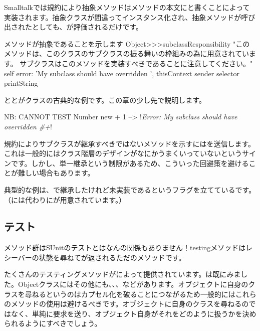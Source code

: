 \documentclass[a4paper,10pt,twoside]{book}
\begin{document}
Smalltalkでは規約により抽象メソッドはメソッドの本文にと書くことによって実装されます。抽象クラスが間違ってインスタンス化され、抽象メソッドが呼び出されたとしても、が評価されるだけです。

\begin{method}{メソッドが抽象であることを示します}
Object>>>subclassResponsibility
    "このメソッドは、このクラスのサブクラスの振る舞いの枠組みの為に用意されています。
    サブクラスはこのメソッドを実装すべきであることに注意してください。"
    self error: 'My subclass should have overridden ', thisContext sender selector printString
\end{method}

ととがクラスの古典的な例です。この章の少し先で説明します。

\begin{code}{NB: CANNOT TEST}
Number new + 1 --> !\emph{Error: My subclass should have overridden \#+}!
\end{code}

規約によりサブクラスが継承すべきではないメソッドを示すにはを送信します。これは一般的にはクラス階層のデザインがなにかうまくいっていないというサインです。しかし、単一継承という制限があるため、こういった回避策を避けることが難しい場合もあります。

典型的な例は、で継承したけれど未実装であるというフラグを立てているです。（には代わりにが用意されています。）



\subsection{テスト}

メソッド群はSUnitのテストとはなんの関係もありません！testingメソッドはレシーバーの状態を尋ねてが返されるただのメソッドです。

たくさんのテスティングメソッドがによって提供されています。は既にみました。Objectクラスにはその他にも、、、などがあります。オブジェクトに自身のクラスを尋ねるというのはカプセル化を破ることにつながるため一般的にはこれらのメソッドの使用は避けるべきです。オブジェクトに自身のクラスを尋ねるのではなく、単純に要求を送り、オブジェクト自身がそれをどのように扱うかを決められるようにすべきでしょう。
\end{document}
